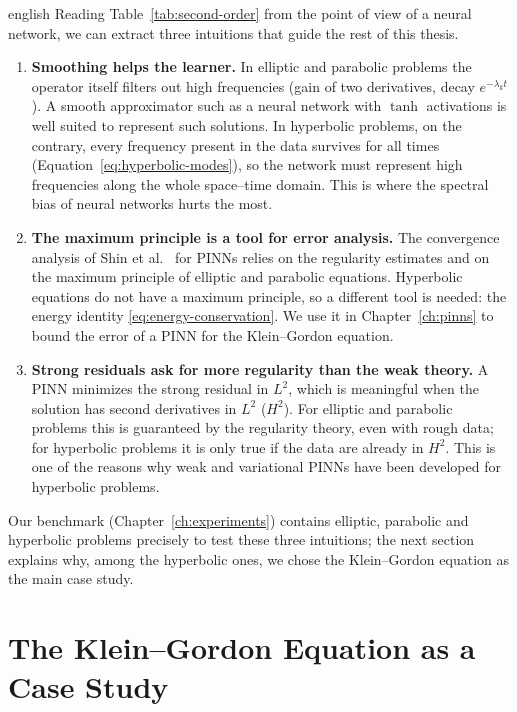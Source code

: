 \documentclass[0000.tex]{subfiles}
\begin{document}
\begin{hyphenrules}{english}
Reading Table~\ref{tab:second-order} from the point of view of a neural network, we can extract three
intuitions that guide the rest of this thesis.
\begin{enumerate}
  \item \textbf{Smoothing helps the learner.} In elliptic and parabolic problems the operator itself
    filters out high frequencies (gain of two derivatives, decay $e^{-\lambda_k t}$). A smooth
    approximator such as a neural network with $\tanh$ activations is well suited to represent such
    solutions. In hyperbolic problems, on the contrary, every frequency present in the data survives
    for all times (Equation~\eqref{eq:hyperbolic-modes}), so the network must represent high frequencies along the
    whole space--time domain. This is where the spectral bias of neural networks
    \cite{rahaman2019,wang2021eigenvector} hurts the most.
  \item \textbf{The maximum principle is a tool for error analysis.} The convergence analysis of
    Shin et al.~\cite{shin2020convergence} for PINNs relies on the regularity estimates and on the maximum
    principle of elliptic and parabolic equations. Hyperbolic equations do not have a maximum principle,
    so a different tool is needed: the energy identity \eqref{eq:energy-conservation}. We use it in
    Chapter~\ref{ch:pinns} to bound the error of a PINN for the Klein--Gordon equation.
  \item \textbf{Strong residuals ask for more regularity than the weak theory.} A PINN minimizes the
    strong residual in $L^2$, which is meaningful when the solution has second derivatives in $L^2$
    ($H^2$). For elliptic and parabolic problems this is guaranteed by the regularity theory, even with
    rough data; for hyperbolic problems it is only true if the data are already in $H^2$. This is one of
    the reasons why weak and variational PINNs \cite{kharazmi2021,deryck2024wpinn} have been
    developed for hyperbolic problems.
\end{enumerate}

Our benchmark (Chapter~\ref{ch:experiments}) contains elliptic, parabolic and hyperbolic problems precisely to
test these three intuitions; the next section explains why, among the hyperbolic ones, we chose the
Klein--Gordon equation as the main case study.

\section{The Klein--Gordon Equation as a Case Study}\label{sec:klein-gordon}


\end{hyphenrules}
\end{document}
